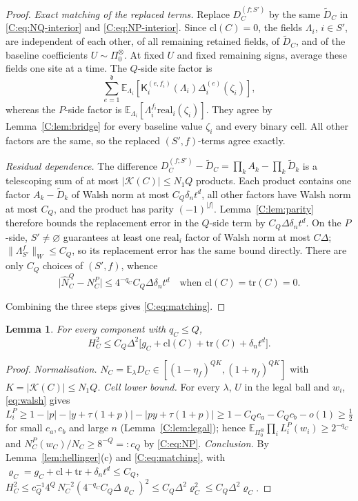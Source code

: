 \documentclass[11pt]{article}
\newtheorem{lemma}[lemma]{Lemma}
\newcommand{\E}{\mathbb{E}}
\newcommand{\cK}{\mathcal{K}}
\newcommand{\norm}[1]{\lVert #1\rVert}
\newcommand{\abs}[1]{\lvert #1\rvert}
\newcommand{\dg}{\mathfrak{d}}
\newcommand{\K}{\mathsf{K}}
\newcommand{\real}{\mathrm{real}}
\begin{document}
\begin{proof}
\emph{Exact matching of the replaced terms.}
Replace \(D_C^{(f;S')}\) by the same \(\widetilde D_C\) in
\eqref{C:eq:NQ-interior} and \eqref{C:eq:NP-interior}.
Since \(\mathrm{cl}(C)=0\), the fields \(\Lambda_i\), \(i\in S'\), are
independent of each other, of all remaining retained fields, of
\(\widetilde D_C\), and of the baseline coefficients
\(U\sim\Pi_0^\otimes\).  At fixed \(U\) and fixed remaining signs,
average these fields one site at a time.  The \(Q\)-side site factor is
\[
 \sum_{e=1}^{\dg}\E_{\Lambda_i}
       [\K_i^{(e,f_i)}(\Lambda_i)\Delta_i^{(e)}(\zeta_i)],
\]
whereas the \(P\)-side factor is
\(\E_{\Lambda_i}[\Lambda_i^{f_i}\real_i(\zeta_i)]\).
They agree by Lemma~\ref{C:lem:bridge} for every baseline value
\(\zeta_i\) and every binary cell.  All other factors are the same,
so the replaced \((S',f)\)-terms agree exactly.

\emph{Residual dependence.}
The difference
\(D_C^{(f;S')}-\widetilde D_C=\prod_kA_k-\prod_k\widetilde D_k\)
is a telescoping sum of at most \(\abs{\cK(C)}\le N_1Q\) products.
Each product contains one factor \(A_k-\widetilde D_k\) of Walsh norm
at most \(C_Q\delta_nt^d\), all other factors have Walsh norm at most
\(C_Q\), and the product has parity \((-1)^{\abs f}\).
Lemma~\ref{C:lem:parity} therefore bounds the replacement error in the
\(Q\)-side term by \(C_Q\Delta\delta_nt^d\).
On the \(P\)-side, \(S'\ne\varnothing\) guarantees at least one
\(\real_i\) factor of Walsh norm at most \(C\Delta\);
\(\norm{\Lambda_{S'}^f}_W\le C_Q\), so its replacement error has the
same bound directly.  There are only \(C_Q\) choices of \((S',f)\),
whence
\[
 \abs{\widehat N^Q_C-N^P_C}
       \le4^{-q_C}C_Q\Delta\delta_nt^d
 \quad\text{when }\mathrm{cl}(C)=\mathrm{tr}(C)=0.
\]

Combining the three steps gives \eqref{C:eq:matching}.
\end{proof}

\begin{lemma}\label{C:lem:HC}
For every component with \(q_C\le Q\),
\begin{equation}
 H^2_C\le C_Q\Delta^2\bigl[g_C+\mathrm{cl}(C)+\mathrm{tr}(C)+\delta_nt^d\bigr].
 \label{C:eq:HC}
\end{equation}
\end{lemma}
\begin{proof}
\emph{Normalisation.}  \(N_C=\E_\lambda D_C\in[(1-\eta_f)^{QK},(1+\eta_f)^{QK}]\)
with \(K=\abs{\cK(C)}\le N_1Q\).
\emph{Cell lower bound.}  For every \(\lambda\), \(U\) in the legal ball and
\(w_i\), \eqref{eq:walsh} gives
\(L^P_i\ge1-\abs{p}-\abs{y+\tau(1+p)}-\abs{py+\tau(1+p)}
\ge1-C_Qc_a-C_Qc_b-o(1)\ge\tfrac12\) for small \(c_a,c_b\) and large \(n\)
(Lemma~\ref{C:lem:legal}); hence \(\E_{\Pi_0^\otimes}\prod_iL^P_i(w_i)\ge2^{-q_C}\)
and \(N^P_C(w_C)/N_C\ge8^{-Q}=:c_Q\) by \eqref{C:eq:NP}.
\emph{Conclusion.}  By Lemma~\ref{lem:hellinger}(c) and
\eqref{C:eq:matching}, with \(\varrho_C=g_C+\mathrm{cl}+\mathrm{tr}+\delta_nt^d\le C_Q\),
\(H^2_C\le c_Q^{-1}4^{Q}\,N_C^{-2}(4^{-q_C}C_Q\Delta\varrho_C)^2\le C_Q\Delta^2\varrho_C^2\le C_Q\Delta^2\varrho_C\).
\end{proof}
\end{document}
